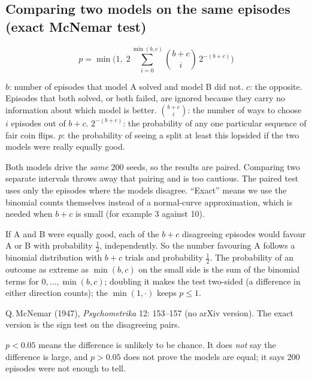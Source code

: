 \subsection{Comparing two models on the same episodes (exact McNemar test)}
\[p=\min\!\Big(1,\;2\sum_{i=0}^{\min(b,c)}\binom{b+c}{i}\,2^{-(b+c)}\Big)\]
\begin{description}[leftmargin=2.6cm,style=nextline]
\item[Symbols] $b$: number of episodes that model A solved and model B did not. $c$: the opposite. Episodes that both solved, or both failed, are ignored because they carry no information about which model is better. $\binom{b+c}{i}$: the number of ways to choose $i$ episodes out of $b+c$. $2^{-(b+c)}$: the probability of any one particular sequence of fair coin flips. $p$: the probability of seeing a split at least this lopsided if the two models were really equally good.
\item[Why] Both models drive the \emph{same} 200 seeds, so the results are paired. Comparing two separate intervals throws away that pairing and is too cautious. The paired test uses only the episodes where the models disagree. ``Exact'' means we use the binomial counts themselves instead of a normal-curve approximation, which is needed when $b+c$ is small (for example 3 against 10).
\item[Derivation] If A and B were equally good, each of the $b+c$ disagreeing episodes would favour A or B with probability $\tfrac12$, independently. So the number favouring A follows a binomial distribution with $b+c$ trials and probability $\tfrac12$. The probability of an outcome as extreme as $\min(b,c)$ on the small side is the sum of the binomial terms for $0,\dots,\min(b,c)$; doubling it makes the test two-sided (a difference in either direction counts); the $\min(1,\cdot)$ keeps $p\le1$.
\item[Source] Q.\,McNemar (1947), \emph{Psychometrika} 12: 153--157 (no arXiv version). The exact version is the sign test on the disagreeing pairs.
\item[Reading $p$] $p<0.05$ means the difference is unlikely to be chance. It does \emph{not} say the difference is large, and $p>0.05$ does not prove the models are equal; it says 200 episodes were not enough to tell.
\end{description}

